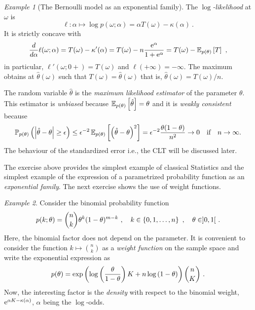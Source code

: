 \documentclass[12pt,a4paper]{amsart}
\theoremstyle{plain}%
\theoremstyle{definition}
\theoremstyle{remark}
\newtheorem{example}{Example}
\begin{document}
\begin{example}[The Bernoulli model as an exponential family]
The \emph{$\log$-likelihood} at $\omega$ is
\begin{equation*}
 \ell \colon \alpha \mapsto \log p(\omega;\alpha) = \alpha T(\omega) - \kappa(\alpha) \ .
\end{equation*}
It is strictly concave with
\begin{equation*}
  \frac{d}{d\alpha} \ell(\omega;\alpha) = T(\omega) - \kappa'(\alpha) = T(\omega) -  n \frac{\mathrm{e}^\alpha}{1+\mathrm{e}^\alpha} = T(\omega) - \operatorname{\mathbb E}_{p(\theta)}\left[T\right] \ ,
\end{equation*}
in particular, $\ell'(\omega;0+) = T(\omega)$ and $\ell(+\infty) = -\infty$. The maximum obtains at $\hat\theta(\omega)$ such that $T(\omega) = \hat\theta(\omega)$ that is, $\hat \theta(\omega) = T(\omega)/n$.

The random variable $\hat \theta$ is the \emph{maximum likelihood estimator} of the parameter $\theta$. This estimator is \emph{unbiased} because $\operatorname{\mathbb E}_{p(\theta)}\left[\hat \theta\right] = \theta$ and it is \emph{weakly consistent} because
\begin{equation*}
\operatorname{\mathbb P}_{p(\theta)}\left(\left\vert\hat \theta - \theta\right\vert \geq \epsilon\right) \leq \epsilon^{-2} \operatorname{\mathbb E}_{p(\theta)}\left[\left(\hat \theta - \theta\right)^2\right] = \epsilon^{-2} \frac{\theta(1-\theta)}{n^2} \to 0 \quad \text{if} \quad n\to\infty .
\end{equation*}
The behaviour of the standardized error i.e., the CLT will be discussed later.
\end{example}

The exercise above provides the simplest example of classical Statistics and the simplest example of the expression of a parametrized probability function as an \emph{exponential family}. The next exercise shows the use of weight functions. 
\begin{example}
Consider the binomial probability function
\begin{equation*}
  p(k;\theta) = \binom n k \theta^k (1-\theta)^{m-k} \ , \quad k \in \left\{0,1,\dots,n\right\} \ , \quad \theta \in ]0,1[ \ .
\end{equation*}
Here, the binomial factor does not depend on the parameter. It is convenient to consider the function $k \mapsto \binom n k$ as a \emph{weight function} on the sample space and write the exponential expression as
\begin{equation*}
  p(\theta) = \exp\left(\log\left(\frac{\theta}{1-\theta}\right) K + n \log\left(1-\theta\right)\right) \binom n K \ .
\end{equation*}
Now, the interesting factor is the \emph{density} with respect to the binomial weight, $\mathrm{e}^{\alpha K - \kappa(\alpha)}$, $\alpha$ being the $\log$-odds.
\end{example}
\end{document}
